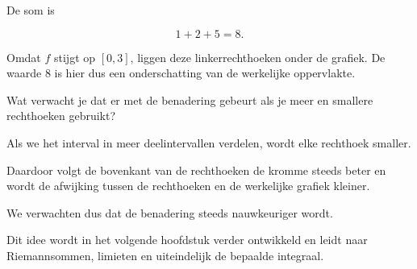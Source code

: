 \documentclass{ximera}
\begin{document}
\begin{oefening}{\oefG}
\begin{question}
\begin{oplossing}
De som is

\[
1+2+5=\boxed{8}.
\]

Omdat \(f\) stijgt op \([0,3]\), liggen deze linkerrechthoeken onder de
grafiek. De waarde \(8\) is hier dus een onderschatting van de werkelijke
oppervlakte.

\end{oplossing}
\end{question}

\begin{question}
Wat verwacht je dat er met de benadering gebeurt als je meer en smallere
rechthoeken gebruikt?

\begin{oplossing}

Als we het interval in meer deelintervallen verdelen, wordt elke
rechthoek smaller.

Daardoor volgt de bovenkant van de rechthoeken de kromme steeds beter en
wordt de afwijking tussen de rechthoeken en de werkelijke grafiek kleiner.

We verwachten dus dat de benadering steeds nauwkeuriger wordt.

Dit idee wordt in het volgende hoofdstuk verder ontwikkeld en leidt naar
Riemannsommen, limieten en uiteindelijk de bepaalde integraal.

\end{oplossing}
\end{question}

\end{oefening}
\end{document}
